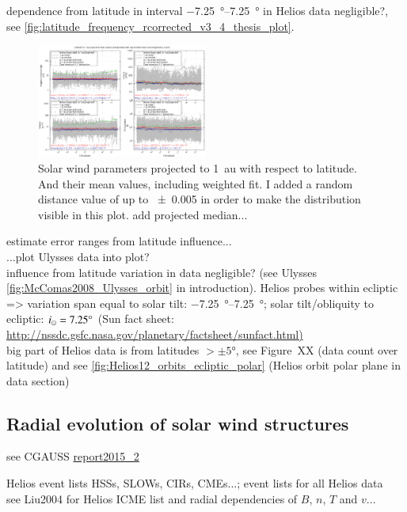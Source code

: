 dependence from latitude in interval \SIrange{-7.25}{7.25}{\degree} in Helios data negligible?, see \autoref{fig:latitude_frequency_rcorrected_v3_4_thesis_plot}.\\
\begin{figure}[htb]
	\centering
	\includegraphics[width=0.5\textwidth]{figures_of_mine/gnuplots/latitude_frequency_rcorrected_v3_4_thesis_plot.png}
	\caption{Solar wind parameters projected to 1~au with respect to latitude. And their mean values, including weighted fit. I added a random distance value of up to \SI{+-0.005}{\au} in order to make the distribution visible in this plot. add projected median...}
	\label{fig:latitude_frequency_rcorrected_v3_4_thesis_plot}
\end{figure}
estimate error ranges from latitude influence...\\

...plot Ulysses data into plot?\\

influence from latitude variation in data negligible? (see Ulysses \autoref{fig:McComas2008_Ulysses_orbit} in introduction). Helios probes within ecliptic => variation span equal to solar tilt: \SIrange{-7.25}{7.25}{\degree}; solar tilt/obliquity to ecliptic: $i_\odot = 7.25\degree$ (Sun fact sheet: \url{http://nssdc.gsfc.nasa.gov/planetary/factsheet/sunfact.html)}\\
big part of Helios data is from latitudes $>\pm5$°, see Figure~XX (data count over latitude) and see \autoref{fig:Helios12_orbits_ecliptic_polar} (Helios orbit polar plane in data section)\\


\subsection{Radial evolution of solar wind structures}
see CGAUSS \url{report2015_2}

Helios event lists HSSs, SLOWs, CIRs, CMEs...; event lists for all Helios data\\
see Liu2004 for Helios ICME list and radial dependencies of $B$, $n$, $T$ and $v$...\\

